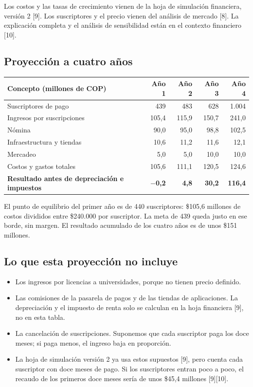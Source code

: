 \documentclass[11pt,a4paper]{article}
\begin{document}
Los costos y las tasas de crecimiento vienen de la hoja de simulación financiera, versión 2 [9]. Los suscriptores y el precio vienen del análisis de mercado [8]. La explicación completa y el análisis de sensibilidad están en el contexto financiero [10].

\subsection{Proyección a cuatro años}

\begin{tabularx}{\textwidth}{X r r r r}
  \toprule
  \textbf{Concepto (millones de COP)} & \textbf{Año 1} & \textbf{Año 2} & \textbf{Año 3} & \textbf{Año 4} \\
  \midrule
  Suscriptores de pago & 439 & 483 & 628 & 1.004 \\
  Ingresos por suscripciones & 105,4 & 115,9 & 150,7 & 241,0 \\
  Nómina & 90,0 & 95,0 & 98,8 & 102,5 \\
  Infraestructura y tiendas & 10,6 & 11,2 & 11,6 & 12,1 \\
  Mercadeo & 5,0 & 5,0 & 10,0 & 10,0 \\
  Costos y gastos totales & 105,6 & 111,1 & 120,5 & 124,6 \\
  \textbf{Resultado antes de depreciación e impuestos} & \textbf{$-$0,2} & \textbf{4,8} & \textbf{30,2} & \textbf{116,4} \\
  \bottomrule
\end{tabularx}

El punto de equilibrio del primer año es de 440 suscriptores: \$105,6 millones de costos divididos entre \$240.000 por suscriptor. La meta de 439 queda justo en ese borde, sin margen. El resultado acumulado de los cuatro años es de unos \$151 millones.

\subsection{Lo que esta proyección no incluye}

\begin{itemize}[leftmargin=1.5em]
  \item Los ingresos por licencias a universidades, porque no tienen precio definido.
  \item Las comisiones de la pasarela de pagos y de las tiendas de aplicaciones. La depreciación y el impuesto de renta solo se calculan en la hoja financiera [9], no en esta tabla.
  \item La cancelación de suscripciones. Suponemos que cada suscriptor paga los doce meses; si paga menos, el ingreso baja en proporción.
  \item La hoja de simulación versión 2 ya usa estos supuestos [9], pero cuenta cada suscriptor con doce meses de pago. Si los suscriptores entran poco a poco, el recaudo de los primeros doce meses sería de unos \$45,4 millones [9][10].
\end{itemize}
\end{document}
